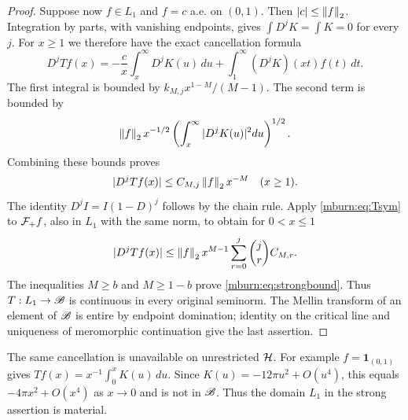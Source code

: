 \documentclass[11pt]{article}
\begin{document}
\begin{proof}
Suppose now $f\in L_1$ and $f=c$ a.e. on $(0,1)$. Then
$|c|\leq\left\lVert f\right\rVert_2$. Integration by parts, with vanishing
endpoints, gives $\int D^jK=\int K=0$ for every $j$. For $x\geq1$
we therefore have the exact cancellation formula
\[
 D^jTf(x)=-\frac c x\int_x^\infty D^jK(u)\,du
                      +\int_1^\infty(D^jK)(xt)f(t)\,dt.
\]
The first integral is bounded by $k_{M,j}x^{1-M}/(M-1)$.
The second term is bounded by
\[
 \left\lVert f\right\rVert_2x^{-1/2}\left(\int_x^\infty|D^jK(u)|^2du\right)^{1/2}.
\]
Combining these bounds proves
\begin{equation}\label{mburn:eq:tail}
 |D^jTf(x)|\leq C_{M,j}\left\lVert f\right\rVert_2 x^{-M}\quad(x\geq1).
\end{equation}
The identity $D^jI=I(1-D)^j$ follows by the chain rule. Apply
\eqref{mburn:eq:Tsym} to $\mathcal F_+ f$, also in $L_1$ with the same norm,
to obtain for $0<x\leq1$
\[
 |D^jTf(x)|\leq\left\lVert f\right\rVert_2 x^{M-1}
                           \sum_{r=0}^j\binom jr C_{M,r}.
\]
The inequalities $M\geq b$ and $M\geq1-b$ prove
\eqref{mburn:eq:strongbound}. Thus $T:L_1\to\mathscr B$ is continuous in
every original seminorm. The Mellin transform of an element of
$\mathscr B$ is entire by endpoint domination; identity on the critical
line and uniqueness of meromorphic continuation give the last
assertion.
\end{proof}

The same cancellation is unavailable on unrestricted $\mathcal H$.
For example $f=\mathbf1_{(0,1)}$ gives
$Tf(x)=x^{-1}\int_0^xK(u)\,du$. Since
$K(u)=-12\pi u^2+O(u^4)$, this equals
$-4\pi x^2+O(x^4)$ as $x\to0$ and is not in $\mathscr B$.
Thus the domain $L_1$ in the strong assertion is material.
\end{document}
